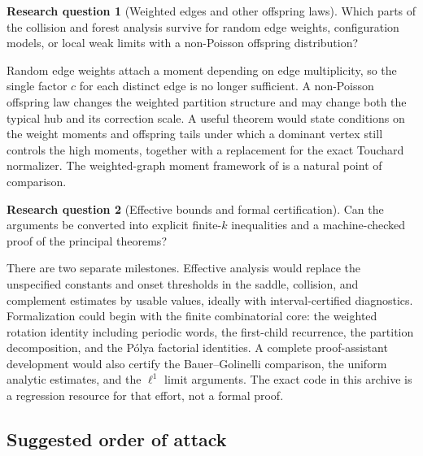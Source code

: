 \documentclass[11pt,letterpaper]{article}
\theoremstyle{remark}\newtheorem{remark}[theorem]{Remark}
\theoremstyle{definition}\newtheorem{definition}[theorem]{Definition}
\newtheorem{question}{Research question}[section]\theoremstyle{plain}
\begin{document}
\begin{question}[Weighted edges and other offspring laws]\label{sgm:md:q:weighted}
Which parts of the collision and forest analysis survive for
random edge weights, configuration models, or local weak limits
with a non-Poisson offspring distribution?
\end{question}
Random edge weights attach a moment depending on edge multiplicity,
so the single factor $c$ for each distinct edge is no longer
sufficient. A non-Poisson offspring law changes the weighted partition
structure and may change both the typical hub and its correction
scale. A useful theorem would state conditions on the weight moments
and offspring tails under which a dominant vertex still controls
the high moments, together with a replacement for the exact
Touchard normalizer. The weighted-graph moment framework of
\cite{Khorunzhy2004} is a natural point of comparison.

\begin{question}[Effective bounds and formal certification]\label{sgm:md:q:effective}
Can the arguments be converted into explicit finite-$k$ inequalities
and a machine-checked proof of the principal theorems?
\end{question}
There are two separate milestones. Effective analysis would replace
the unspecified constants and onset thresholds in the saddle,
collision, and complement estimates by usable values, ideally with
interval-certified diagnostics. Formalization could begin with the
finite combinatorial core: the weighted rotation identity including
periodic words, the first-child recurrence, the partition
decomposition, and the P\'olya factorial identities. A complete
proof-assistant development would also certify the
Bauer--Golinelli comparison, the uniform analytic estimates, and
the $\ell^1$ limit arguments. The exact code in this archive is a
regression resource for that effort, not a formal proof.

\subsection{Suggested order of attack}
\end{document}
